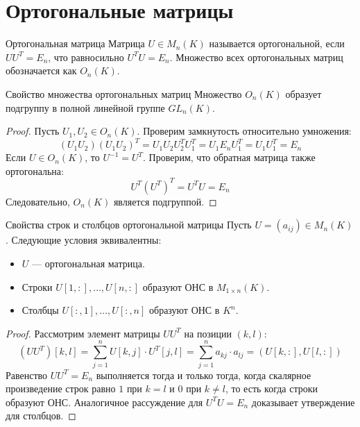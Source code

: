 \section{Ортогональные матрицы}

\begin{Definition}{Ортогональная матрица}{}
	Матрица $U \in M_n(K)$ называется ортогональной, если $U U^T = E_n$, что равносильно $U^T U = E_n$.
	Множество всех ортогональных матриц обозначается как $O_n(K)$.
\end{Definition}

\begin{Lemma}{Свойство множества ортогональных матриц}{}
	Множество $O_n(K)$ образует подгруппу в полной линейной группе $GL_n(K)$.
\end{Lemma}

\begin{proof}
	Пусть $U_1, U_2 \in O_n(K)$. Проверим замкнутость относительно умножения:
	\[
	(U_1 U_2)(U_1 U_2)^T = U_1 U_2 U_2^T U_1^T = U_1 E_n U_1^T = U_1 U_1^T = E_n
	\] 
	Если $U \in O_n(K)$, то $U^{-1} = U^T$.
	Проверим, что обратная матрица также ортогональна:
	\[
	U^T (U^T)^T = U^T U = E_n
	\] 
	Следовательно, $O_n(K)$ является подгруппой.
\end{proof}

\begin{Proposition}{Свойства строк и столбцов ортогональной матрицы}{}
	Пусть $U = (a_{ij}) \in M_n(K)$. Следующие условия эквивалентны:
	\begin{itemize}
		\item $U$ — ортогональная матрица.
		\item Строки $U[1, :], \dots, U[n, :]$ образуют ОНС в $M_{1 \times n}(K)$.
		\item Столбцы $U[:, 1], \dots, U[:, n]$ образуют ОНС в $K^n$.
	\end{itemize}
\end{Proposition}

\begin{proof}
	Рассмотрим элемент матрицы $U U^T$ на позиции $(k, l)$:
	\[
	(U U^T)[k, l] = \sum_{j=1}^n U[k, j] \cdot U^T[j, l] = \sum_{j=1}^n a_{kj} \cdot a_{lj} = (U[k, :], U[l, :])
	\] 
	Равенство $U U^T = E_n$ выполняется тогда и только тогда, когда скалярное произведение строк равно $1$ при $k=l$ и $0$ при $k \neq l$, то есть когда строки образуют ОНС.
	Аналогичное рассуждение для $U^T U = E_n$ доказывает утверждение для столбцов.
\end{proof}

